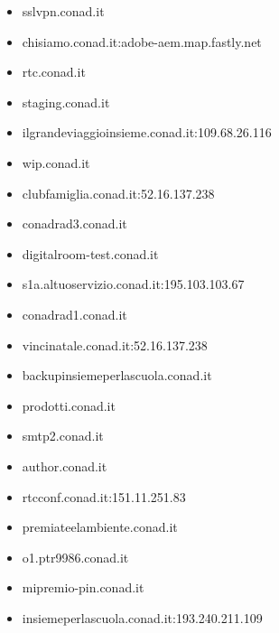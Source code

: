 \documentclass{article}
\begin{document}
\begin{itemize}
        \item sslvpn.conad.it
    
        \item chisiamo.conad.it:adobe-aem.map.fastly.net
    
        \item rtc.conad.it
    
        \item staging.conad.it
    
        \item ilgrandeviaggioinsieme.conad.it:109.68.26.116
    
        \item wip.conad.it
    
        \item clubfamiglia.conad.it:52.16.137.238
    
        \item conadrad3.conad.it
    
        \item digitalroom-test.conad.it
    
        \item s1a.altuoservizio.conad.it:195.103.103.67
    
        \item conadrad1.conad.it
    
        \item vincinatale.conad.it:52.16.137.238
    
        \item backupinsiemeperlascuola.conad.it
    
        \item prodotti.conad.it
    
        \item smtp2.conad.it
    
        \item author.conad.it
    
        \item rtcconf.conad.it:151.11.251.83
    
        \item premiateelambiente.conad.it
    
        \item o1.ptr9986.conad.it
    
        \item mipremio-pin.conad.it
    
        \item insiemeperlascuola.conad.it:193.240.211.109
    

\end{itemize}
\end{document}
